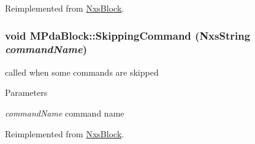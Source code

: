 Reimplemented from \hyperlink{classNxsBlock}{NxsBlock}.\hypertarget{classMPdaBlock_a8fdbc4b20dbfc882e40438a0d8903702}{
\subsubsection[{SkippingCommand}]{\setlength{\rightskip}{0pt plus 5cm}void MPdaBlock::SkippingCommand ({\bf NxsString} {\em commandName})}}
\label{classMPdaBlock_a8fdbc4b20dbfc882e40438a0d8903702}
called when some commands are skipped 
\begin{DoxyParams}{Parameters}
\item[{\em commandName}]command name \end{DoxyParams}


Reimplemented from \hyperlink{classNxsBlock}{NxsBlock}.

